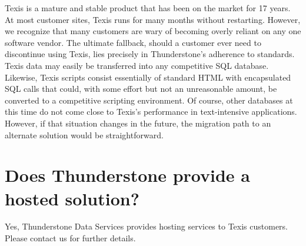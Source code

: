Texis is a mature and stable product that has been on the market for
17 years. At most customer sites, Texis runs for many months without
restarting. However, we recognize that many customers are wary of
becoming overly reliant on any one software vendor. The ultimate
fallback, should a customer ever need to discontinue using Texis, lies
precisely in Thunderstone's adherence to standards. Texis data may
easily be transferred into any competitive SQL database. Likewise,
Texis scripts consist essentially of standard HTML with encapsulated
SQL calls that could, with some effort but not an unreasonable amount,
be converted to a competitive scripting environment. Of course, other
databases at this time do not come close to Texis's performance in
text-intensive applications. However, if that situation changes in the
future, the migration path to an alternate solution would be
straightforward.

\section{Does Thunderstone provide a hosted solution?}

Yes, Thunderstone Data Services provides hosting services to Texis
customers.  Please contact us for further details.




